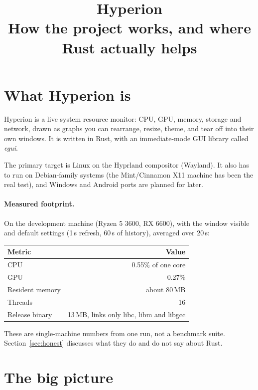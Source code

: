 \documentclass[11pt,a4paper]{article}
\title{\textbf{Hyperion}\\[0.3em]\large How the project works, and where Rust actually helps}
\author{}
\date{}
\begin{document}
\maketitle
\tableofcontents
\bigskip

\section{What Hyperion is}

Hyperion is a live system resource monitor: CPU, GPU, memory, storage and network, drawn as
graphs you can rearrange, resize, theme, and tear off into their own windows. It is written
in Rust, with an immediate-mode GUI library called \emph{egui}.

The primary target is Linux on the Hyprland compositor (Wayland). It also has to run on
Debian-family systems (the Mint/Cinnamon X11 machine has been the real test), and Windows and
Android ports are planned for later.

\paragraph{Measured footprint.} On the development machine (Ryzen 5 3600, RX 6600), with the
window visible and default settings (1\,s refresh, 60\,s of history), averaged over 20\,s:

\begin{center}
\begin{tabular}{lr}
\toprule
Metric & Value \\
\midrule
CPU & 0.55\% of one core \\
GPU & 0.27\% \\
Resident memory & about 80\,MB \\
Threads & 16 \\
Release binary & 13\,MB, links only libc, libm and libgcc \\
\bottomrule
\end{tabular}
\end{center}

These are single-machine numbers from one run, not a benchmark suite. Section~\ref{sec:honest}
discusses what they do and do not say about Rust.

\section{The big picture}
\end{document}
